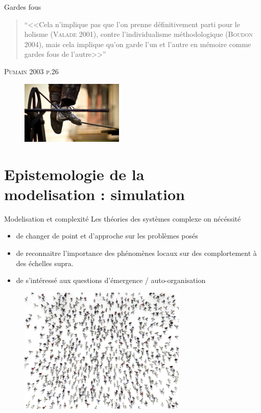 \documentclass[newPxFont]{beamer}
\begin{document}
\begin{frame}[c]{Gardes fous}
\vspace{-1em}
\begin{quote}
  \enquote{<<Cela n'implique pas que l'on prenne définitivement parti pour le holisme (\textsc{Valade 2001}), contre l'individualisme méthodologique (\textsc{Boudon 2004}), mais cela implique qu'on garde l'un et l'autre en mémoire comme gardes fous de l'autre>>}
\end{quote}
\hspace*{\fill}\textsc{Pumain 2003 p.26}
\vspace{-0.5em}
\begin{figure}
 \includegraphics[height=3cm]{img/a_Funambule.jpg}
\end{figure}
\end{frame}

\section{Epistemologie de la\\ modelisation : simulation}

\begin{frame}[c]{Modelisation et complexité}
\vspace{-2em}
Les théories des systèmes complexe on nécéssité
\begin{itemize}
  \item de changer de point et d'approche sur les problèmes posés
  \item de reconnaitre l'importance des phénomènes locaux sur des complortement à des échelles supra.
  \item de s'intéressé aux questions d'émergence / auto-organisation
\end{itemize}
\begin{figure}
 \includegraphics[height=6cm]{img/a_crowd.jpg}
\end{figure}
\end{frame}
\end{document}

